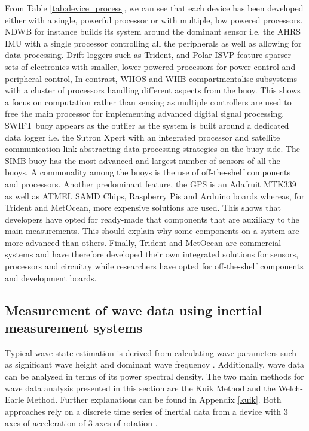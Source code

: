 From Table \ref{tab:device_process}, we can see that each device has been developed either with a single, powerful processor or with multiple, low powered processors. NDWB for instance builds its system around the dominant sensor i.e. the AHRS IMU with a single processor controlling all the peripherals as well as allowing for data processing. Drift loggers such as Trident, and Polar ISVP feature sparser sets of electronics with smaller, lower-powered processors for power control and peripheral control, In contrast, WIIOS and WIIB compartmentalise subsystems with a cluster of processors handling different aspects from the buoy. This shows a focus on computation rather than sensing as multiple controllers are used to free the main processor for implementing advanced digital signal processing. SWIFT buoy appears as the outlier as the system is built around a dedicated data logger i.e. the Sutron Xpert with an integrated processor and satellite communication link abstracting data processing strategies on the buoy side. The SIMB buoy has the most advanced and largest number of sensors of all the buoys. A commonality among the buoys is the use of off-the-shelf components and processors. Another predominant feature, the GPS is an Adafruit MTK339 as well as ATMEL SAMD Chips, Raspberry Pis and Arduino boards whereas, for Trident and MetOcean, more expensive solutions are used. This shows that developers have opted for ready-made that components that are auxiliary to the main measurements. This should explain why some components on a system are more advanced than others. Finally, Trident and MetOcean are commercial systems and have therefore developed their own integrated solutions for sensors, processors and circuitry while researchers have opted for off-the-shelf components and development boards.



\subsection{Measurement of wave data using inertial measurement systems}
\label{subsec:ch2_wavemeas}
Typical wave state estimation is derived from calculating wave parameters such as significant wave height and dominant wave frequency \cite{williams2013wave}. Additionally, wave data can be analysed in terms of its power spectral density. The two main methods for wave data analysis presented in this section are the Kuik Method and the Welch-Earle Method. Further explanations can be found in Appendix \ref{kuik}. Both approaches rely on a discrete time series of inertial data from a device with 3 axes of acceleration of 3 axes of rotation \cite{kuik1988method,earle1996nondirectional}.

